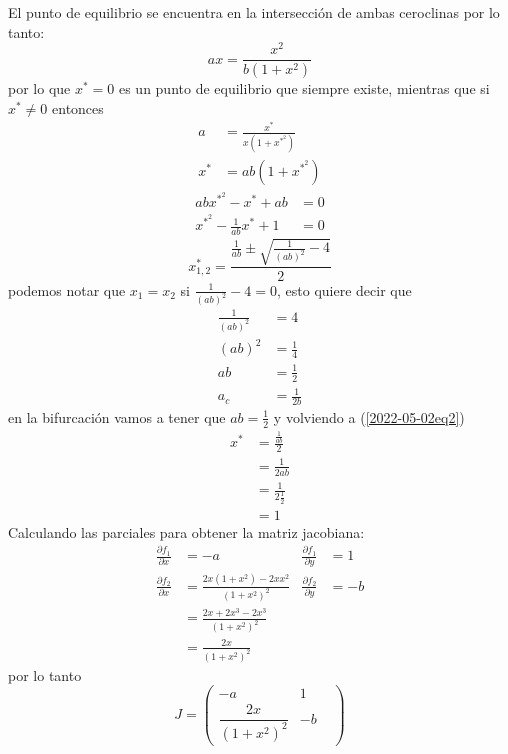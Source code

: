 \begin{ejemplo}
	El punto de equilibrio se encuentra en la intersección de ambas ceroclinas por lo tanto:
	\begin{equation*}
	    ax = \frac{x^2}{b(1+x^2)} 
	\end{equation*}
	por lo que $x^*=0$ es un punto de equilibrio que siempre existe, mientras que si $x^*\neq 0$ entonces
	\begin{equation}
		\label{2022-05-02eq1}
		\begin{split}
			a&= \frac{x^*}{x(1+x^{{*}^2})} \\
			x^*&=ab(1+x^{{*}^2})
		\end{split}
	\end{equation}
	\begin{align*}
		abx^{{*}^2}-x^*+ab&=0 \\
		x^{{*}^2}-\frac{1}{ab}x^*+1 &= 0  
	\end{align*}
	\begin{equation}
		\label{2022-05-02eq2}
	    x^*_{1,2} = \frac{\frac{1}{ab}\pm \sqrt{\frac{1}{(ab)^2}-4}}{2} 
	\end{equation}
	podemos notar que $x_1=x_2$ si $\frac{1}{(ab)^2}-4=0$, esto quiere decir que
	\begin{align*}
	  \frac{1}{(ab)^2} &= 4 \\
		(ab)^2 &= \frac{1}{4} \\
		ab &= \frac{1}{2} \\
		a_c &= \frac{1}{2b} 
	\end{align*}
	en la bifurcación vamos a tener que $ab=\frac{1}{2}$ y volviendo a (\ref{2022-05-02eq2}) 
	\begin{align*}
	  x^*&= \frac{\frac{1}{ab}}{2} \\
	   &= \frac{1}{2ab} \\
	    &= \frac{1}{2 \frac{1}{2}} \\
	     &= 1
	\end{align*}
	Calculando las parciales para obtener la matriz jacobiana:
	\begin{align*}
		\frac{\partial f_1}{\partial x} &= -a & \frac{\partial f_1}{\partial y}  &= 1  \\
				\frac{\partial f_2}{\partial x} &= \frac{2x(1+x^2)-2xx^2}{(1+x^2)^2} & 		\frac{\partial f_2}{\partial y} &= -b  \\
		 &= \frac{2x+2x^3-2x^3}{(1+x^2)^2} \\
		 &= \frac{2x}{(1+x^2)^2} 
	\end{align*}
	por lo tanto
		\begin{equation*}
	    J = \begin{pmatrix} -a & 1 & \\ \dfrac{2x}{(1+x^2)^2} & -b \end{pmatrix}  

\end{equation*}
\end{ejemplo}
